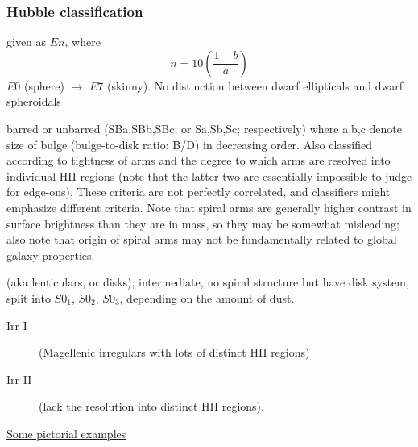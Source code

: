 \documentclass{article}
\begin{document}
\subsubsection{Hubble classification}
\begin{description}
    \item [ellipticals:] given as $En$, where
        \[
            n = 10\left( \frac{1-b}{a} \right)
            \]
        $E0$ (sphere) $\rightarrow$ $E7$ (skinny).
        No distinction between dwarf ellipticals and dwarf spheroidals
    \item [spirals:] barred or unbarred (SBa,SBb,SBc; or Sa,Sb,Sc;
        respectively) where a,b,c denote size of bulge (bulge-to-disk ratio:
        B/D) in decreasing order. Also classified according to tightness of
        arms and the degree to which arms are resolved into individual HII
        regions (note that the latter two are essentially impossible to judge
        for edge-ons). These criteria are not perfectly correlated, and
        classifiers might emphasize different criteria.
        Note that spiral arms are generally higher contrast in surface
        brightness than they are in mass, so they may be somewhat misleading;
        also note that origin of spiral arms may not be fundamentally related
        to global galaxy properties.
    \item [S0s:] (aka lenticulars, or disks); intermediate, no spiral
        structure but have disk system, split into $S0_{1}$, $S0_{2}$, $S0_{3}$,
        depending on the amount of dust.
    \item [irregulars:]
        \begin{description}
            \item [Irr I] (Magellenic irregulars with lots of distinct HII regions)
            \item [Irr II] (lack the resolution into distinct HII regions).
        \end{description}
    \item \href{http://people.virginia.edu//~dmw8f/astr5630/Topic02/t2_Hubble_orientation.jpg}
        {Some pictorial examples}
\end{description}
\end{document}
